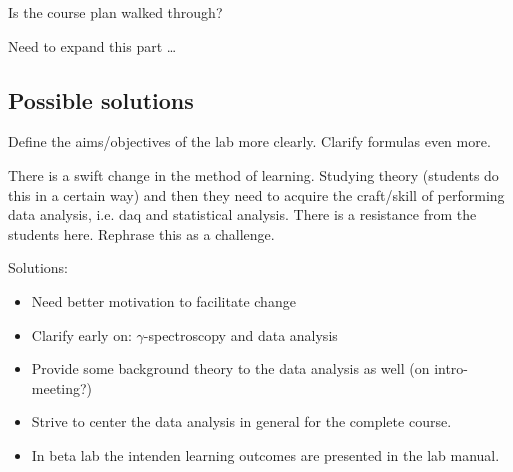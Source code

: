 \documentclass[]{article}
\begin{document}
Is the course plan walked through?

Need to expand this part \dots


\subsection{Possible solutions}
Define the aims/objectives of the lab more clearly. Clarify formulas even more.

There is a swift change in the method of learning.
Studying theory (students do this in a certain way) and then they need to acquire the craft/skill of performing data analysis, i.e. daq and statistical analysis.
There is a resistance from the students here.
Rephrase this as a challenge.

Solutions:
\begin{itemize}
  \item Need better motivation to facilitate change
  \item Clarify early on: $\gamma$-spectroscopy and data analysis
  \item Provide some background theory to the data analysis as well (on intro-meeting?)
  \item Strive to center the data analysis in general for the complete course.
  \item In beta lab the intenden learning outcomes are presented in the lab manual.
\end{itemize}
\end{document}
